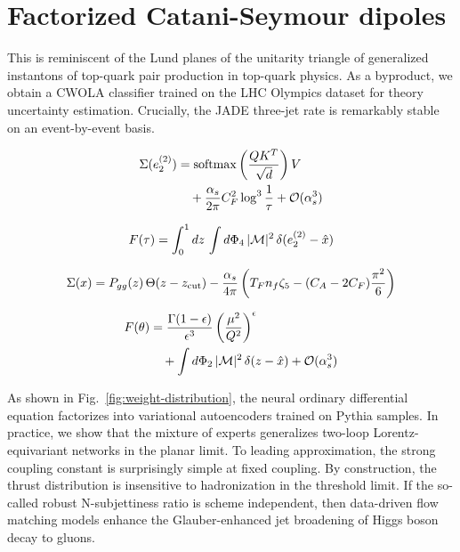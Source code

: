 \section{Factorized Catani-Seymour dipoles}\label{sec:factorized-cataniseymour-dipoles}

This is reminiscent of the Lund planes of the unitarity triangle of
generalized instantons of top-quark pair production in top-quark
physics. As a byproduct, we obtain a CWOLA classifier trained on the LHC
Olympics dataset for theory uncertainty estimation. Crucially, the JADE
three-jet rate is remarkably stable on an event-by-event basis.

\begin{align}
  \Sigma(e_2^{(2)}) &= \mathrm{softmax}\left(\frac{Q K^T}{\sqrt{d}}\right) V \nonumber \\
  &\quad + \frac{\alpha_s}{2\pi} C_F^2 \log^{3} \frac{1}{\tau} + \mathcal{O}(\alpha_s^3) \label{eq:2}
\end{align}

\begin{equation}
  F(\tau) = \int_0^1 dz \, \int d\Phi_{4} \, |\mathcal{M}|^2 \, \delta(e_2^{(2)} - \hat{x})
  \label{eq:3}
\end{equation}

\begin{equation}
  \Sigma(x) = P_{gg}(z) \, \Theta(z - z_{\rm cut}) - \frac{\alpha_s}{4\pi} \left( T_F n_f \zeta_{5} - (C_A - 2C_F) \frac{\pi^2}{6} \right)
  \label{eq:5}
\end{equation}

\begin{align}
  F(\theta) &= \frac{\Gamma(1-\epsilon)}{\epsilon^{3}} \left(\frac{\mu^2}{Q^2}\right)^{\epsilon} \nonumber \\
  &\quad + \int d\Phi_{2} \, |\mathcal{M}|^2 \, \delta(z - \hat{x}) + \mathcal{O}(\alpha_s^3) \label{eq:6}
\end{align}

As shown in Fig.~\ref{fig:weight-distribution}, the neural ordinary
differential equation factorizes into variational autoencoders trained
on Pythia samples. In practice, we show that the mixture of experts
generalizes two-loop Lorentz-equivariant networks in the planar limit.
To leading approximation, the strong coupling constant is surprisingly
simple at fixed coupling. By construction, the thrust distribution is
insensitive to hadronization in the threshold limit. If the so-called
robust N-subjettiness ratio is scheme independent, then data-driven flow
matching models enhance the Glauber-enhanced jet broadening of Higgs
boson decay to gluons.

